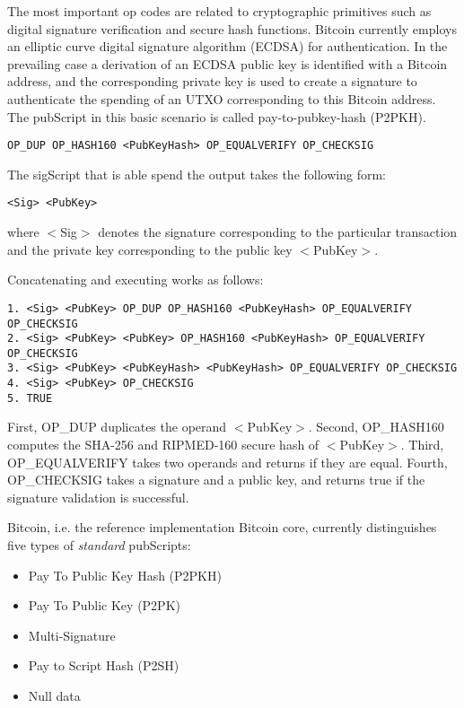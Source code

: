 The most important op codes are related to cryptographic primitives such as digital signature verification and secure hash functions. Bitcoin currently employs an elliptic curve digital signature algorithm (ECDSA) for authentication. In the prevailing case a derivation of an ECDSA public key is identified with a Bitcoin address, and the corresponding private key is used to create a signature to authenticate the spending of an UTXO corresponding to this Bitcoin address. 
The pubScript in this basic scenario is called pay-to-pubkey-hash (P2PKH).

\begin{lstlisting}
OP_DUP OP_HASH160 <PubKeyHash> OP_EQUALVERIFY OP_CHECKSIG
\end{lstlisting}

The sigScript that is able spend the output takes the following form:

\begin{lstlisting}
<Sig> <PubKey>
\end{lstlisting}

where $<$Sig$>$ denotes the signature corresponding to the particular transaction and the private key corresponding to the public key $<$PubKey$>$.

Concatenating and executing works as follows:

\begin{lstlisting}[breaklines]
1. <Sig> <PubKey> OP_DUP OP_HASH160 <PubKeyHash> OP_EQUALVERIFY OP_CHECKSIG
2. <Sig> <PubKey> <PubKey> OP_HASH160 <PubKeyHash> OP_EQUALVERIFY OP_CHECKSIG
3. <Sig> <PubKey> <PubKeyHash> <PubKeyHash> OP_EQUALVERIFY OP_CHECKSIG
4. <Sig> <PubKey> OP_CHECKSIG
5. TRUE
\end{lstlisting}

First, OP\_DUP duplicates the operand $<$PubKey$>$. Second, OP\_HASH160 computes the SHA-256 and RIPMED-160 secure hash of $<$PubKey$>$. Third, OP\_EQUALVERIFY takes two operands and returns if they are equal. Fourth, OP\_CHECKSIG takes a signature and a public key, and returns true if the signature validation is successful. 

Bitcoin, i.e. the reference implementation Bitcoin core, currently distinguishes five types of \emph{standard} pubScripts:

\begin{itemize}
\item Pay To Public Key Hash (P2PKH)
\item Pay To Public Key (P2PK)
\item Multi-Signature 
\item Pay to Script Hash (P2SH)
\item Null data
\end{itemize}

